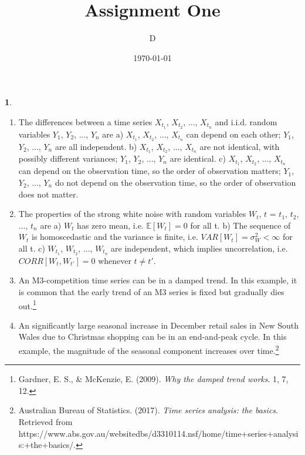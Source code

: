 \documentclass[10pt]{article}
\author{D}
\newtheorem{prob}{\bm{$Problem$}}
\begin{document}
\title{Assignment One}
\date{\today}
\maketitle
\thispagestyle{fancy}
\thispagestyle{fancy}

\begin{prob}
\end{prob}
\begin{enumerate}[1)]
\vspace{3mm}

\item
The differences between a time series $X_{t_1}$, $X_{t_2}$, ..., $X_{t_n}$ and i.i.d. random variables $Y_1$, $Y_2$, ..., $Y_n$ are
\subitem
a) $X_{t_1}$, $X_{t_2}$, ..., $X_{t_n}$ can depend on each other; $Y_1$, $Y_2$, ..., $Y_n$ are all independent.
\subitem
b) $X_{t_1}$, $X_{t_2}$, ..., $X_{t_n}$ are not identical, with possibly different variances; $Y_1$, $Y_2$, ..., $Y_n$ are identical.
\subitem
c) $X_{t_1}$, $X_{t_2}$, ..., $X_{t_n}$ can depend on the observation time, so the order of observation matters; $Y_1$, $Y_2$, ..., $Y_n$ do not depend on the observation time, so the order of observation does not matter.
\vspace{3mm}

\item
The properties of the strong white noise with random variables $W_t$, $t$ = $t_1$, $t_2$, ..., $t_n$ are
\subitem
a) $W_t$ has zero mean, i.e. $\mathbb{E}[W_t] = 0$ for all t.
\subitem
b) The sequence of $W_t$ is homoscedastic and the variance is finite, i.e. $VAR[W_t] = \sigma^2_W < \infty$ for all t.
\subitem
c) $W_{t_1}$, $W_{t_2}$, ..., $W_{t_n}$ are independent, which implies uncorrelation, i.e. $CORR[W_t, W_{t'}] = 0$ whenever $t \neq t'$.
\vspace{3mm}

\item
An M3-competition time series can be in a damped trend. In this example, it is common that the early trend of an M3 series is fixed but gradually dies out.\footnote{ Gardner, E. S., \& McKenzie, E. (2009). \textit{Why the damped trend works}. 1, 7, 12.}
\vspace{3mm}

\item
An significantly large seasonal increase in December retail sales in New South Wales due to Christmas shopping can be in an end-and-peak cycle. In this example, the magnitude of the seasonal component increases over time.\footnote{ Australian Bureau of Statistics. (2017). \textit{Time series analysis: the basics}. Retrieved from https://www.abs.gov.au/websitedbs/d3310114.nsf/home/time+series+analysis:+the+basics/.}

\end{enumerate}
\vspace{3mm}
\end{document}
